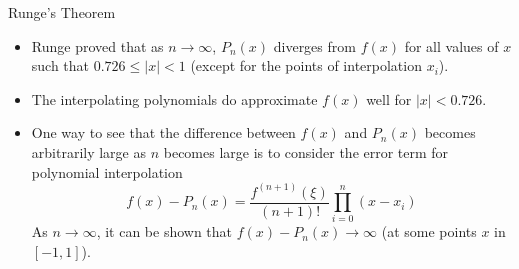 \documentclass[12pt]{beamer}
\begin{document}
\begin{frame}{Runge's Theorem}
\begin{itemize}
\item{Runge proved that as $n \rightarrow \infty$, $P_n(x)$ diverges from $f(x)$ for all values of $x$ such that $0.726 \leq |x| < 1$ (except for the points of interpolation $x_i$).}
\item{The interpolating polynomials do approximate $f(x)$ well for $|x|<0.726$.}
\item{One way to see that the difference between $f(x)$ and $P_n(x)$ becomes arbitrarily large as $n$ becomes large is to consider the error term for polynomial interpolation
\[
f(x)-P_n(x) = \frac{f^{(n+1)}(\xi)}{(n+1)!} \prod_{i=0}^{n} (x - x_i)
\]
\noindent
As $n \rightarrow \infty$, it can be shown that $f(x)-P_n(x) \rightarrow \infty$ (at some points $x$ in $[-1,1]$).}
\end{itemize}
\end{frame}
\end{document}
